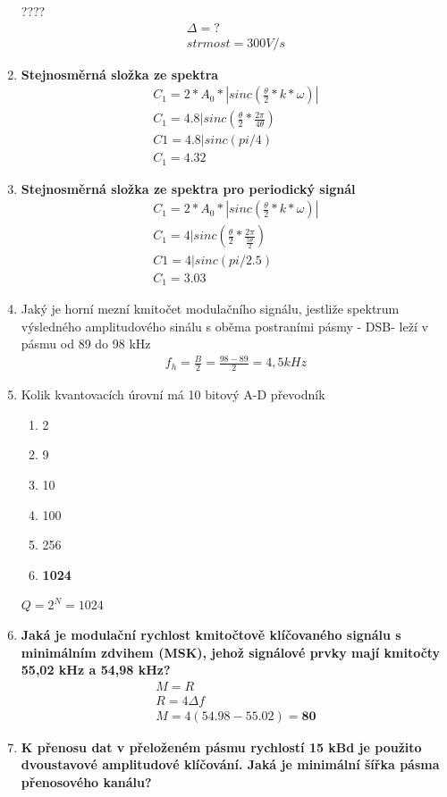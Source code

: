 \begin{enumerate}
????
    \begin{align*}
        \Delta=? \\
        strmost = 300 V/s
    \end{align*}
    \item \textbf{Stejnosměrná složka ze spektra}
    \begin{align*}
        C_1=2*A_0*|sinc(\frac{\theta}{2}*k*\omega)| \\
        C_1=4.8|sinc(\frac{\theta}{2}*\frac{2\pi}{4\theta})\\
        C1=4.8|sinc(pi/4)\\
        C_1=4.32
    \end{align*}
    \item \textbf{Stejnosměrná složka ze spektra pro periodický signál}
    \begin{align*} 
        C_1=2*A_0*|sinc(\frac{\theta}{2}*k*\omega)| \\
        C_1=4|sinc(\frac{\theta}{2}*\frac{2\pi}{\frac{5\theta}{2}})\\
        C1=4|sinc(pi/2.5)\\
        C_1=3.03
    \end{align*}
    \item Jaký je horní mezní kmitočet modulačního signálu, jestliže spektrum výsledného amplitudového sinálu s oběma postraními pásmy - DSB- leží v pásmu od 89 do 98 kHz
    \begin{align*}
        f_h=\frac{B}{2}=\frac{98-89}{2}= 4,5 kHz
    \end{align*}
    \item Kolik kvantovacích úrovní má 10 bitový A-D převodník 
    \begin{enumerate}
        \item 2
        \item 9
        \item 10
        \item 100
        \item 256
        \item \textbf{1024}
    \end{enumerate}
    $Q=2^N=1024$
     \item \textbf{Jaká je modulační rychlost kmitočtově klíčovaného signálu s minimálním zdvihem (\textbf{MSK}), 
    jehož signálové prvky mají kmitočty 55,02 kHz a 54,98 kHz?}
    \begin{align*}
    M=R\\
    R=4\Delta f \\
    M=4(54.98-55.02)= \textbf{80}
    \end{align*}
    \item  \textbf{K přenosu dat v přeloženém pásmu rychlostí 15 kBd je použito dvoustavové amplitudové 
klíčování. Jaká je minimální šířka pásma přenosového kanálu?}


\end{enumerate}
